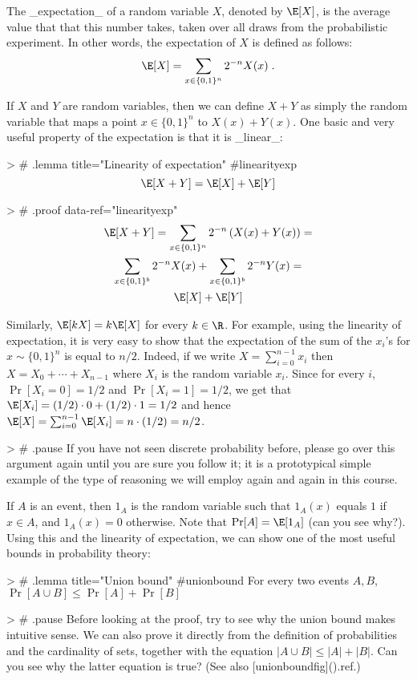 The _expectation_ of a random variable $X$, denoted by $\E[X]$, is the average value that that this number takes, taken over all draws from the probabilistic experiment.
In other words, the expectation of $X$ is defined as follows:
$$
\E[X] = \sum_{x\in \{0,1\}^n} 2^{-n}X(x) \;.
$$



If $X$ and $Y$ are random variables, then we can define $X+Y$ as simply the random variable that maps a point $x\in \{0,1\}^n$ to $X(x)+Y(x)$.
One basic and very useful property of the expectation is that it is _linear_:

> # {.lemma title="Linearity of expectation" #linearityexp}
$$ \E[ X+Y ] = \E[X] + \E[Y] $$

> # {.proof data-ref="linearityexp"}
$$
\begin{gathered}
\E [X+Y] = \sum_{x\in \{0,1\}^n}2^{-n}\left(X(x)+Y(x)\right) =  \\
\sum_{x\in \{0,1\}^b} 2^{-n}X(x) + \sum_{x\in \{0,1\}^b} 2^{-n}Y(x) = \\
\E[X] + \E[Y]
\end{gathered}
$$

Similarly, $\E[kX] = k\E[X]$ for every $k \in \R$.
For example, using the linearity of expectation, it is very easy to show that the expectation of the sum of the $x_i$'s for $x \sim \{0,1\}^n$ is equal to $n/2$.
Indeed, if we write $X= \sum_{i=0}^{n-1} x_i$ then $X= X_0 + \cdots + X_{n-1}$ where $X_i$ is the random variable $x_i$. Since for every $i$, $\Pr[X_i=0] = 1/2$ and $\Pr[X_i=1]=1/2$, we get that $\E[X_i] = (1/2)\cdot 0 + (1/2)\cdot 1 = 1/2$ and hence $\E[X] = \sum_{i=0}^{n-1}\E[X_i] = n\cdot(1/2) = n/2$.


> # { .pause }
If you have not seen discrete probability before, please go over this argument again until you are sure you follow it; it is a prototypical simple example of the type of reasoning we will employ again and again in this course.

If $A$ is an event, then $1_A$ is the random variable such that $1_A(x)$ equals $1$ if $x\in A$, and $1_A(x)=0$ otherwise.
Note that $\Pr[A] = \E[1_A]$ (can you see why?).
Using this and the linearity of expectation, we can show one of the most useful bounds in probability theory:

> # {.lemma title="Union bound" #unionbound}
For every two events $A,B$, $\Pr[ A \cup B] \leq \Pr[A]+\Pr[B]$

> # { .pause }
Before looking at the proof, try to see why the union bound makes intuitive sense. We can also prove it directly from the definition of probabilities and the cardinality of sets, together with the equation $|A \cup B| \leq |A|+|B|$. Can you see why the latter equation is true? (See also [unionboundfig](){.ref}.)

